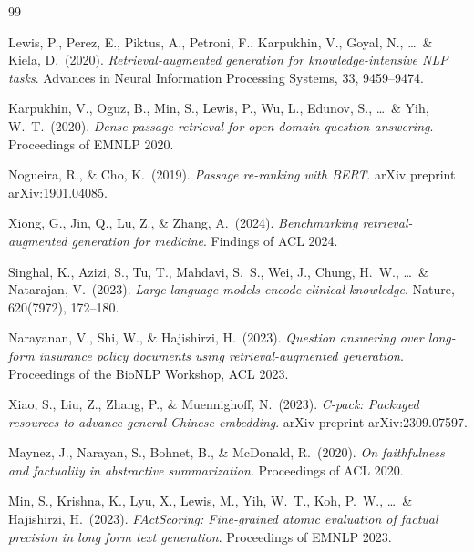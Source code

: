 \documentclass[12pt, letterpaper]{article}
\begin{document}

\begin{thebibliography}{99}

Lewis, P., Perez, E., Piktus, A., Petroni, F., Karpukhin, V., Goyal, N., \ldots\ \& Kiela, D.\ (2020).
\textit{Retrieval-augmented generation for knowledge-intensive NLP tasks}.
Advances in Neural Information Processing Systems, 33, 9459--9474.

Karpukhin, V., Oguz, B., Min, S., Lewis, P., Wu, L., Edunov, S., \ldots\ \& Yih, W.\ T.\ (2020).
\textit{Dense passage retrieval for open-domain question answering}.
Proceedings of EMNLP 2020.

Nogueira, R., \& Cho, K.\ (2019).
\textit{Passage re-ranking with BERT}.
arXiv preprint arXiv:1901.04085.

Xiong, G., Jin, Q., Lu, Z., \& Zhang, A.\ (2024).
\textit{Benchmarking retrieval-augmented generation for medicine}.
Findings of ACL 2024.

Singhal, K., Azizi, S., Tu, T., Mahdavi, S.\ S., Wei, J., Chung, H.\ W., \ldots\ \& Natarajan, V.\ (2023).
\textit{Large language models encode clinical knowledge}.
Nature, 620(7972), 172--180.

Narayanan, V., Shi, W., \& Hajishirzi, H.\ (2023).
\textit{Question answering over long-form insurance policy documents using retrieval-augmented generation}.
Proceedings of the BioNLP Workshop, ACL 2023.

Xiao, S., Liu, Z., Zhang, P., \& Muennighoff, N.\ (2023).
\textit{C-pack: Packaged resources to advance general Chinese embedding}.
arXiv preprint arXiv:2309.07597.

Maynez, J., Narayan, S., Bohnet, B., \& McDonald, R.\ (2020).
\textit{On faithfulness and factuality in abstractive summarization}.
Proceedings of ACL 2020.

Min, S., Krishna, K., Lyu, X., Lewis, M., Yih, W.\ T., Koh, P.\ W., \ldots\ \& Hajishirzi, H.\ (2023).
\textit{FActScoring: Fine-grained atomic evaluation of factual precision in long form text generation}.
Proceedings of EMNLP 2023.

\end{thebibliography}
\end{document}
